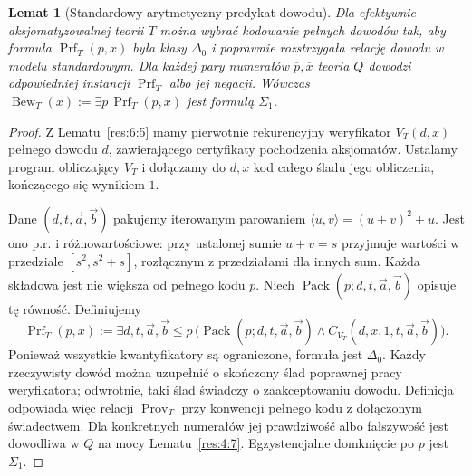 \documentclass[11pt,a4paper]{article}
\numberwithin{equation}{section}
\theoremstyle{plain}
\newtheorem{lemat}[twierdzenie]{Lemat}
\theoremstyle{definition}
\theoremstyle{remark}
\begin{document}
\begin{lemat}[Standardowy arytmetyczny predykat dowodu]\label{res:7:7}
Dla efektywnie aksjomatyzowalnej teorii $T$ można wybrać kodowanie pełnych dowodów tak, aby formuła $\operatorname{Prf}_T(p,x)$ była klasy $\Delta_0$ i poprawnie rozstrzygała relację dowodu w modelu standardowym. Dla każdej pary numerałów $\overline p,\overline x$ teoria $Q$ dowodzi odpowiedniej instancji $\operatorname{Prf}_T$ albo jej negacji. Wówczas $\operatorname{Bew}_T(x):=\exists p\,\operatorname{Prf}_T(p,x)$ jest formułą $\Sigma_1$.
\end{lemat}
\begin{proof}
Z Lematu~\ref{res:6:5} mamy pierwotnie rekurencyjny weryfikator $V_T(d,x)$ pełnego dowodu $d$, zawierającego certyfikaty pochodzenia aksjomatów. Ustalamy program obliczający $V_T$ i dołączamy do $d,x$ kod całego śladu jego obliczenia, kończącego się wynikiem $1$.

Dane $(d,t,\vec a,\vec b)$ pakujemy iterowanym parowaniem
$\langle u,v\rangle=(u+v)^2+u$. Jest ono p.r. i różnowartościowe: przy ustalonej sumie $u+v=s$ przyjmuje wartości w przedziale $[s^2,s^2+s]$, rozłącznym z przedziałami dla innych sum. Każda składowa jest nie większa od pełnego kodu $p$. Niech $\operatorname{Pack}(p;d,t,\vec a,\vec b)$ opisuje tę równość. Definiujemy
\[
\operatorname{Prf}_T(p,x):=\exists d,t,\vec a,\vec b\le p\,
\bigl(\operatorname{Pack}(p;d,t,\vec a,\vec b)\land
C_{V_T}(d,x,1,t,\vec a,\vec b)\bigr).
\]
Ponieważ wszystkie kwantyfikatory są ograniczone, formuła jest $\Delta_0$. Każdy rzeczywisty dowód można uzupełnić o skończony ślad poprawnej pracy weryfikatora; odwrotnie, taki ślad świadczy o zaakceptowaniu dowodu. Definicja odpowiada więc relacji $\operatorname{Prov}_T$ przy konwencji pełnego kodu z dołączonym świadectwem. Dla konkretnych numerałów jej prawdziwość albo fałszywość jest dowodliwa w $Q$ na mocy Lematu~\ref{res:4:7}. Egzystencjalne domknięcie po $p$ jest $\Sigma_1$.
\end{proof}

\end{document}
